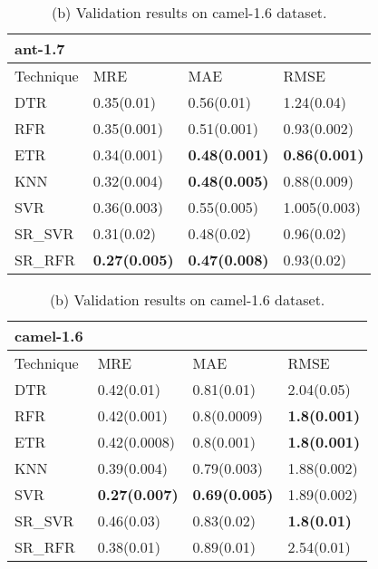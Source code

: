 \documentclass[]{article}
\begin{document}
	\begin{table}[h]
		\captionsetup[subtable]{labelformat=empty}
		\begin{adjustwidth}{-3.4cm}{}
			\begin{subtable}{9.5cm}
				\centering
				\caption{(a) Validation results on ant-1.7 dataset.}
				\label{tab:ant-wv}
				\begin{tabular}{llll}
					\hline
					ant-1.7 &&&\\ \hline
					Technique & MRE & MAE & RMSE\\  \hline
					DTR & 0.35(0.01) & 0.56(0.01) & 1.24(0.04)\\ 
					RFR & 0.35(0.001) & 0.51(0.001) & 0.93(0.002)\\ 
					ETR & 0.34(0.001) & \bfseries 0.48(0.001) & \bfseries 0.86(0.001)\\ 
					KNN & 0.32(0.004) & \bfseries 0.48(0.005) & 0.88(0.009)\\ 
					SVR & 0.36(0.003) & 0.55(0.005) & 1.005(0.003)\\ 
					SR\_SVR & 0.31(0.02) & 0.48(0.02) & 0.96(0.02)\\
					SR\_RFR & \bfseries 0.27(0.005) & \bfseries 0.47(0.008) & 0.93(0.02)\\ \hline
				\end{tabular}
			\end{subtable}
			\begin{subtable}{9cm}
				\centering
				\caption{(b) Validation results on camel-1.6 dataset.}
				\label{tab:camel-wv}
				\begin{tabular}{llll}
					\hline
					camel-1.6 &&&\\ \hline
					Technique & MRE & MAE & RMSE\\  \hline
					DTR & 0.42(0.01) & 0.81(0.01) & 2.04(0.05)\\ 
					RFR & 0.42(0.001) & 0.8(0.0009) & \bfseries 1.8(0.001)\\ 
					ETR & 0.42(0.0008) & 0.8(0.001) & \bfseries 1.8(0.001)\\ 
					KNN & 0.39(0.004) & 0.79(0.003) & 1.88(0.002)\\ 
					SVR & \bfseries 0.27(0.007) & \bfseries 0.69(0.005) & 1.89(0.002)\\ 
					SR\_SVR & 0.46(0.03) & 0.83(0.02) & \bfseries 1.8(0.01)\\
					SR\_RFR & 0.38(0.01) & 0.89(0.01) & 2.54(0.01)\\ \hline
				\end{tabular}
			\end{subtable} 
		\end{adjustwidth}
	\end{table}
\end{document}
